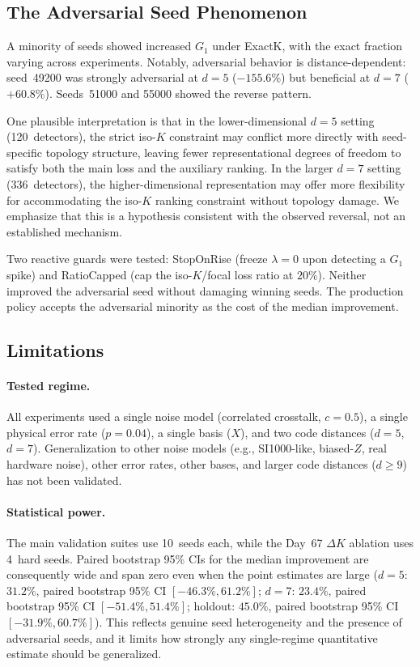 \subsection{The Adversarial Seed Phenomenon}
\label{sec:adversarial}

A minority of seeds showed increased $G_1$ under ExactK, with the exact fraction varying across experiments. Notably, adversarial behavior is distance-dependent: seed~49200 was strongly adversarial at $d{=}5$ ($-155.6\%$) but beneficial at $d{=}7$ ($+60.8\%$). Seeds~51000 and 55000 showed the reverse pattern.

One plausible interpretation is that in the lower-dimensional $d{=}5$ setting (120~detectors), the strict iso-$K$ constraint may conflict more directly with seed-specific topology structure, leaving fewer representational degrees of freedom to satisfy both the main loss and the auxiliary ranking. In the larger $d{=}7$ setting (336~detectors), the higher-dimensional representation may offer more flexibility for accommodating the iso-$K$ ranking constraint without topology damage. We emphasize that this is a hypothesis consistent with the observed reversal, not an established mechanism.

Two reactive guards were tested: StopOnRise (freeze $\lambda{=}0$ upon detecting a $G_1$ spike) and RatioCapped (cap the iso-$K$/focal loss ratio at $20\%$). Neither improved the adversarial seed without damaging winning seeds. The production policy accepts the adversarial minority as the cost of the median improvement.

\subsection{Limitations}

\paragraph{Tested regime.} All experiments used a single noise model (correlated crosstalk, $c{=}0.5$), a single physical error rate ($p{=}0.04$), a single basis ($X$), and two code distances ($d{=}5$, $d{=}7$). Generalization to other noise models (e.g., SI1000-like, biased-$Z$, real hardware noise), other error rates, other bases, and larger code distances ($d \geq 9$) has not been validated.

\paragraph{Statistical power.} The main validation suites use 10~seeds each, while the Day~67 $\Delta K$ ablation uses 4~hard seeds. Paired bootstrap 95\% CIs for the median improvement are consequently wide and span zero even when the point estimates are large ($d{=}5$: $31.2\%$, paired bootstrap 95\% CI $[-46.3\%, 61.2\%]$; $d{=}7$: $23.4\%$, paired bootstrap 95\% CI $[-51.4\%, 51.4\%]$; holdout: $45.0\%$, paired bootstrap 95\% CI $[-31.9\%, 60.7\%]$). This reflects genuine seed heterogeneity and the presence of adversarial seeds, and it limits how strongly any single-regime quantitative estimate should be generalized.


